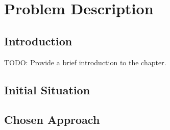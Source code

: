 \chapter{Problem Description}
\label{sec:problem_description}

\section{Introduction}
TODO: Provide a brief introduction to the chapter.

\section{Initial Situation}

\section{Chosen Approach}